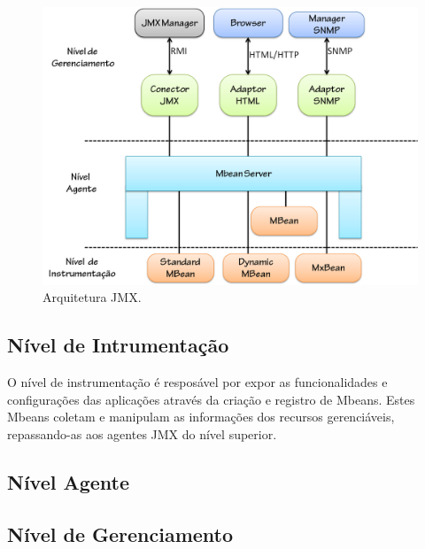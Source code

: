 \begin{figure}[htp]
\centering
\includegraphics[width=12cm]{chapters/chapter4/arch_jmx.png}
\caption[Arquitetura JMX]{Arquitetura JMX.}
\label{fig:arch_jmx}
\end{figure}

\subsection{Nível de Intrumentação}
O nível de instrumentação é resposável por expor as funcionalidades e configurações das aplicações através da criação e registro de Mbeans. Estes Mbeans coletam e manipulam as informações dos recursos gerenciáveis, repassando-as aos agentes JMX do nível superior.

\subsection{Nível Agente}

\subsection{Nível de Gerenciamento}